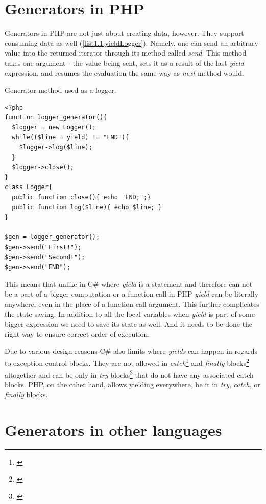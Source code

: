 \section{Generators in PHP}

Generators in PHP are not just about creating data, however. They support consuming data as well (\autoref{list1.1:yieldLogger}). Namely, one can send an arbitrary value into the returned iterator through its method called \emph{send}. This method takes one argument - the value being sent, sets it as a result of the last \emph{yield} expression, and resumes the evaluation the same way as \emph{next} method would.

\begin{listing}[H]
	\caption{Generator method used as a logger.}
	\label{list1.1:yieldLogger}
\begin{verbatim}
<?php
function logger_generator(){
  $logger = new Logger();
  while(($line = yield) != "END"){
    $logger->log($line);
  }
  $logger->close();
}
class Logger{
  public function close(){ echo "END;";}
  public function log($line){ echo $line; }
}

$gen = logger_generator();
$gen->send("First!");
$gen->send("Second!");
$gen->send("END");
\end{verbatim}
\end{listing}

This means that unlike in C\# where \emph{yield} is a statement and therefore can not be a part of a bigger computation or a function call in PHP \emph{yield} can be literally anywhere, even in the place of a function call argument. This further complicates the state saving. In addition to all the local variables when \emph{yield} is part of some bigger expression we need to save its state as well. And it needs to be done the right way to ensure correct order of execution.

Due to various design reasons \citep{CSharpYieldFinaly} C\# also limits where \emph{yields} can happen in regards to exception control blocks. They are not allowed in \emph{catch}\footnote{\citep{CSharpYieldCatch}} and \emph{finally} blocks\footnote{\citep{CSharpYieldFinaly}} altogether and can be only in \emph{try} blocks\footnote{\citep{CSharpYieldTry}} that do not have any associated catch blocks. PHP, on the other hand, allows yielding everywhere, be it in \emph{try}, \emph{catch}, or \emph{finally} blocks.

\section{Generators in other languages}

